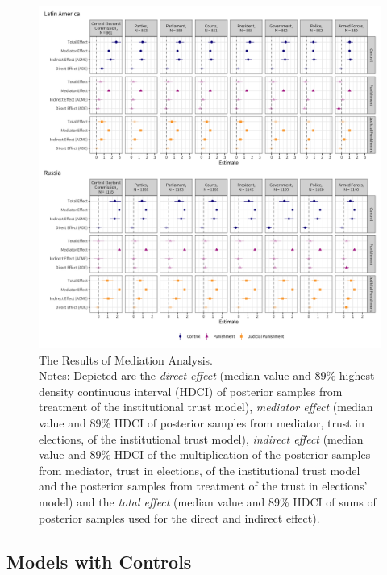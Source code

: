 \documentclass[11pt, ngerman,english,a4]{article}
\begin{document}
    \begin{figure}[H]
    \centering
    \includegraphics[width=\linewidth,trim=4 4 4 4,clip]{figs/mediation_881.png}
    \caption{The Results of Mediation Analysis.  \\
     \footnotesize{Notes: Depicted are the \textit{direct effect }(median value and 89\% highest-density continuous interval (HDCI) of posterior samples from treatment of the institutional trust model), \textit{mediator effect} (median value and 89\% HDCI of posterior samples from mediator, trust in elections, of the institutional trust model), \textit{indirect effect} (median value and 89\% HDCI of the multiplication of the posterior samples from mediator, trust in elections,  of the institutional trust model and the posterior samples from treatment of the trust in elections' model) and the \textit{total effect} (median value and 89\% HDCI of sums of posterior samples used for the direct and indirect effect).  } 
     }
    \singlespacing
    \raggedright
    \label{fig:mediation}
    \end{figure}

\clearpage
\subsection*{Models with Controls}
\end{document}
